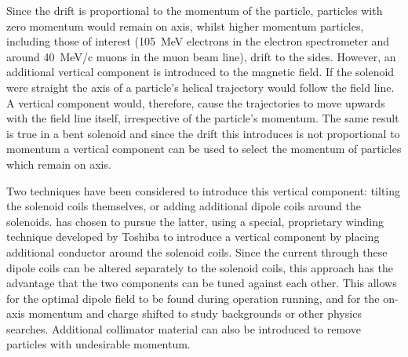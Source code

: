 Since the drift is proportional to the momentum of the particle, particles with zero momentum would remain on axis, whilst higher momentum particles, including those of interest (105~MeV electrons in the \phaseII electron spectrometer and around 40~MeV/c muons in the muon beam line), drift to the sides.  
However, an additional vertical component is introduced to the magnetic field.
If the solenoid were straight the axis of a particle's helical trajectory would follow the field line. 
A vertical component would, therefore, cause the trajectories to move upwards with the field line itself, irrespective of the particle's momentum.
The same result is true in a bent solenoid and since the drift this introduces is not proportional to momentum a vertical component can be used to select the momentum of particles which remain on axis.

Two techniques have been considered to introduce this vertical component: tilting the solenoid coils themselves, or adding additional dipole coils around the solenoids.
\COMET has chosen to pursue the latter, using a special, proprietary winding technique developed by Toshiba to introduce a vertical component by placing additional conductor around the solenoid coils.
Since the current through these dipole coils can be altered separately to the solenoid coils, this approach has the advantage that the two components can be tuned against each other.
This allows for the optimal dipole field to be found during operation running, and for the on-axis momentum and charge shifted to study backgrounds or other physics searches.
Additional collimator material can also be introduced to remove particles with undesirable momentum.


